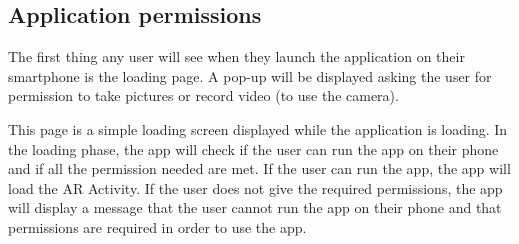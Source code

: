 \subsection{Application permissions}
The first thing any user will see when they launch the application on their smartphone is the loading page. A pop-up will be displayed asking the user for permission to take pictures or record video (to use the camera).

This page is a simple loading screen displayed while the application is loading. In the loading phase, the app will check if the user can run the app on their phone and if all the permission needed are met. If the user can run the app, the app will load the \ac{AR} Activity. If the user does not give the required permissions, the app will display a message that the user cannot run the app on their phone and that permissions are required in order to use the app.


